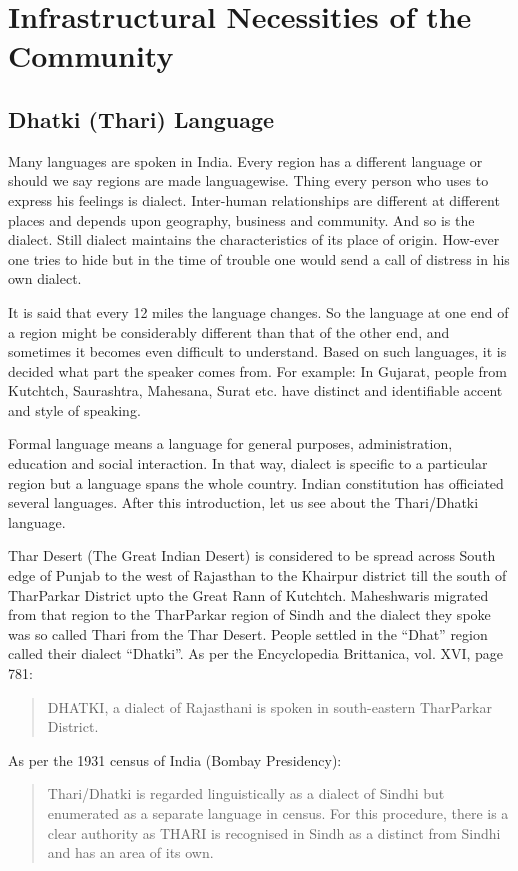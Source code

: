 \chapter{Infrastructural Necessities of the Community}
\section{Dhatki (Thari) Language}
Many languages are spoken in India. Every region has a different language or should we say regions are made languagewise. Thing every person who uses to express his feelings is dialect. Inter-human relationships are different at different places and depends upon geography, business and community. And so is the dialect. Still dialect maintains the characteristics of its place of origin. How-ever one tries to hide but in the time of trouble one would send a call of distress in his own dialect.

It is said that every 12 miles the language changes. So the language at one end of a region might be considerably different than that of the other end, and sometimes it becomes even difficult to understand. Based on such languages, it is decided what part the speaker comes from. For example: In Gujarat, people from Kutchtch, Saurashtra, Mahesana, Surat etc. have distinct and identifiable accent and style of speaking.

Formal language means a language for general purposes, administration, education and social interaction. In that way, dialect is specific to a particular region but a language spans the whole country. Indian constitution has officiated several languages. After this introduction, let us see about the Thari/Dhatki language.

Thar Desert (The Great Indian Desert) is considered to be spread across South edge of Punjab to the west of Rajasthan to the Khairpur district till the south of TharParkar District upto the Great Rann of Kutchtch. Maheshwaris migrated from that region to the TharParkar region of Sindh and the dialect they spoke was so called Thari from the Thar Desert. People settled in the ``Dhat'' region called their dialect ``Dhatki''. As per the Encyclopedia Brittanica, vol. XVI, page 781:
\begin{quotation}
 DHATKI, a dialect of Rajasthani is spoken in south-eastern TharParkar District.
\end{quotation}
As per the 1931 census of India (Bombay Presidency):
\begin{quotation}
 Thari/Dhatki is regarded linguistically as a dialect of Sindhi but enumerated as a separate language in census. For this procedure, there is a clear authority as THARI is recognised in Sindh as a distinct from Sindhi and has an area of its own.
\end{quotation}

